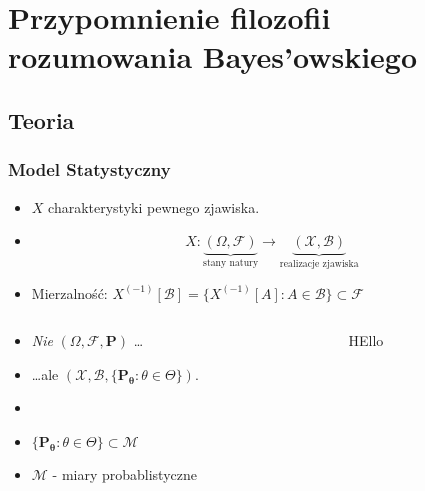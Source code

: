 \section[Bayes]{Przypomnienie filozofii rozumowania Bayes'owskiego}

\subsection{Teoria}

\begin{frame}
	\frametitle{Model Statystyczny}
	
\begin{itemize}
	\item $X $ charakterystyki pewnego zjawiska.
	\item $$X: \underbrace{(\Omega, \mathcal{F})}_{\text{stany natury}}\rightarrow \underbrace{(\mathcal{X}, \mathcal{B})}_{\text{realizacje zjawiska}} $$
	\item Mierzalność: $ X^{(-1)} [ \mathcal{B}] = \{ X^{(-1)} [A] : A \in \mathcal{B} \} \subset \mathcal{F}$
\end{itemize} 	


\begin{columns}
\begin{column}[t]{5cm}
	\begin{itemize}
		\item \emph{Nie} $( \Omega, \mathcal{F}, \mathbf{P} )$ \dots
		\item \dots ale $( \mathcal{X}, \mathcal{B}, \{\mathbf{P_\theta} : \theta \in \Theta\} )$.
		\item
		\item $\{\mathbf{P_\theta} : \theta \in \Theta\} \subset \mathcal{M} $
		\item $\mathcal{M}$ - miary probablistyczne
	\end{itemize}
\end{column}
\begin{column}[t]{5cm}
	\begin{center}
		HEllo	
	\end{center}		
\end{column}
\end{columns}
		
\end{frame}

